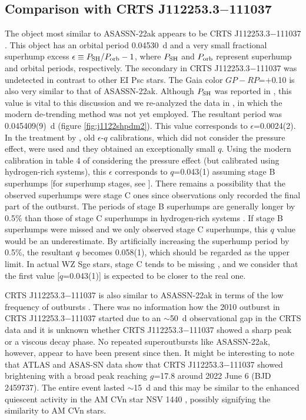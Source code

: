 \documentclass{article}
\begin{document}
\subsection{Comparison with CRTS J112253.3$-$111037}

   The object most similar to ASASSN-22ak appears to be
CRTS J112253.3$-$111037 \citep{bre12j1122}.  This object
has an orbital period 0.04530~d and a very small fractional
superhump excess $\epsilon \equiv P_{\rm SH}/P_{\rm orb}-1$,
where $P_{\rm SH}$ and $P_{\rm orb}$ represent superhump and
orbital periods, respectively.  The secondary in
CRTS J112253.3$-$111037 was undetected in contrast to other
EI Psc stars.  The Gaia color $GP-RP$=$+$0.10 is also very
similar to that of ASASSN-22ak.
Although $P_{\rm SH}$ was reported in \citet{Pdot2}, this value
is vital to this discussion and we re-analyzed the data
in \citet{Pdot2}, in which the modern de-trending method was 
not yet employed.  The resultant period was 0.045409(9)~d
(figure \ref{fig:j1122shpdm2}).  This value corresponds to
$\epsilon$=0.0024(2).  In the treatment by \citet{bre12j1122},
old $\epsilon$-$q$ calibrations, which did not consider
the pressure effect, were used and they obtained
an exceptionally small $q$.  
Using the modern calibration in table 4 of \citet{kat22stageA}
considering the pressure effect (but calibrated using
hydrogen-rich systems), this $\epsilon$ corresponds to
$q$=0.043(1) assuming stage B superhumps [for superhump stages,
see \citet{Pdot}].
There remains a possibility that the observed superhumps
were stage C ones since observations only recorded the final
part of the outburst.  The periods of stage B superhumps
are generally longer by 0.5\% than those of stage C superhumps
in hydrogen-rich systems \citep{Pdot}.  If stage B superhumps
were missed and we only observed stage C superhumps, this
$q$ value would be an underestimate.  By artificially increasing
the superhump period by 0.5\%, the resultant $q$ becomes 0.058(1),
which should be regarded as the upper limit.
In actual WZ Sge stars, stage C tends to be missing
\citep{Pdot,kat15wzsge}, and we consider that the first value
[$q$=0.043(1)] is expected to be closer to the real one.

   CRTS J112253.3$-$111037 is also similar to ASASSN-22ak
in terms of the low frequency of outbursts \citep{bre12j1122}.
There was no information how the 2010 outburst in
CRTS J112253.3$-$111037 started due to an $\sim$50~d
observational gap in the CRTS data \citep{CRTS} and
it is unknown whether CRTS J112253.3$-$111037 showed
a sharp peak or a viscous decay phase.
No repeated superoutbursts like ASASSN-22ak, however, appear to
have been present since then.
It might be interesting to note that ATLAS and ASAS-SN data
show that CRTS J112253.3$-$111037 showed brightening with
a broad peak reaching $g$=17.8 around 2022 June 6 (BJD 2459737).
The entire event lasted $\sim$15~d and this may be similar
to the enhanced quiescent activity in the AM CVn star
NSV 1440 \citep{kat23nsv1440}, possibly signifying
the similarity to AM CVn stars.
\end{document}
